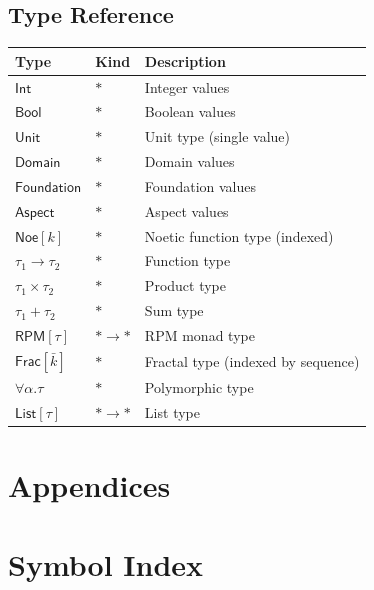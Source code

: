 \documentclass[11pt,twoside,openright]{book}
\theoremstyle{definition}
\theoremstyle{plain}
\theoremstyle{remark}
\begin{document}
\section{Type Reference}

\begin{center}
\begin{tabular}{lll}
\toprule
\textbf{Type} & \textbf{Kind} & \textbf{Description} \\
\midrule
$\mathsf{Int}$ & $*$ & Integer values \\
$\mathsf{Bool}$ & $*$ & Boolean values \\
$\mathsf{Unit}$ & $*$ & Unit type (single value) \\
$\mathsf{Domain}$ & $*$ & Domain values \\
$\mathsf{Foundation}$ & $*$ & Foundation values \\
$\mathsf{Aspect}$ & $*$ & Aspect values \\
$\mathsf{Noe}[k]$ & $*$ & Noetic function type (indexed) \\
$\tau_1 \to \tau_2$ & $*$ & Function type \\
$\tau_1 \times \tau_2$ & $*$ & Product type \\
$\tau_1 + \tau_2$ & $*$ & Sum type \\
$\mathsf{RPM}[\tau]$ & $* \to *$ & RPM monad type \\
$\mathsf{Frac}[\bar{k}]$ & $*$ & Fractal type (indexed by sequence) \\
$\forall \alpha. \tau$ & $*$ & Polymorphic type \\
$\mathsf{List}[\tau]$ & $* \to *$ & List type \\
\bottomrule
\end{tabular}
\end{center}

\chapter{Appendices}
\label{ch:appendices}

\appendix

\chapter{Symbol Index}
\label{app:symbols}
\end{document}
